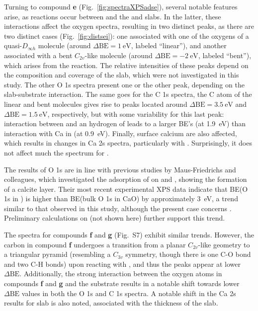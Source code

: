 \documentclass[journal=jpccck,manuscript=article]{achemso}
\def\dbe{\ensuremath{\Delta\text{BE}}}
\begin{document}
Turning to compound \textbf{e} (Fig.~\ref{fig:spectraXPSadse}), several notable features arise, as reactions occur between  and the  and  slabs. In the latter, these interactions affect the oxygen spectra, resulting in two distinct peaks, as there are two distinct cases (Fig.~\ref{fig:distsei}): one associated with one of the oxygens of a quasi-$D_{\infty h}$  molecule  (around $\dbe = \SI{1}{\electronvolt}$, labeled ``linear''), and another associated with a bent $C_{2v}$-like  molecule (around $\dbe = \SI{-2}{\electronvolt}$, labeled ``bent''), which arises from the reaction. The relative intensities of these peaks depend on the composition and coverage of the slab, which were not investigated in this study.\cite{dahleSituPreparationCalcium2012,fujimoriInteractionWaterCaO2016a} The other O 1s spectra present one or the other peak, depending on the slab-substrate interaction. The same goes for the C 1s spectra, the C atom of the linear and bent  molecules gives rise to peaks located around $\dbe = \SI{3.5}{\electronvolt}$ and $\dbe = \SI{1.5}{\electronvolt}$, respectively, but with some variability for this last peak: interaction between  and an hydrogen of  leads to a larger BE's (at \SI{1.9}{\electronvolt}) than interaction with Ca in  (at \SI{0.9}{\electronvolt}). Finally, surface calcium are also affected, which results in changes in Ca 2s spectra, particularly with . Surprisingly, it does not affect much the spectrum for .

The results of O 1s are in line with previous studies by Maus-Friedrichs and colleagues\cite{ochsCO2ChemisorptionCa1998,voigtsAdsorptionCO2CO2009,dahleSituPreparationCalcium2012}, which investigated the adsorption of  on  and , showing the formation of a calcite layer. Their most recent experimental XPS data\cite{dahleSituPreparationCalcium2012} indicate that BE(O 1s in ) is higher than BE(bulk O 1s in CaO) by approximately \SI{3}{\electronvolt}, a trend similar to that observed in this study, although the present case concerns . Preliminary calculations on  (not shown here) further support this trend. 

The spectra for compounds \textbf{f} and \textbf{g} (Fig.~S7) exhibit similar trends. However, the carbon in compound \textbf{f} undergoes a transition from a planar $C_{2v}$-like geometry to a triangular pyramid (resembling a $C_{3v}$ symmetry, though there is one C-O bond and two C-H bonds) upon reacting with , and thus the peaks appear at lower \dbe{}. Additionally, the strong interaction between the oxygen atoms in compounds \textbf{f} and \textbf{g} and the  substrate results in a notable shift towards lower \dbe{} values in both the O 1s and C 1s spectra.  A notable shift in the Ca 2s results for  slab is also noted, associated with the thickness of the slab.
\end{document}
